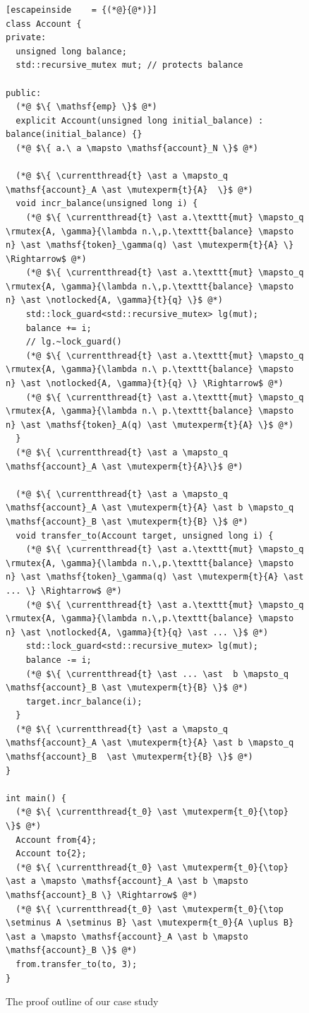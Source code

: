 \documentclass[acmsmall,screen,review,anonymous]{acmart}
\begin{document}
\begin{figure}[hp]
\begin{lstlisting}[escapeinside    = {(*@}{@*)}]
class Account {
private:
  unsigned long balance;
  std::recursive_mutex mut; // protects balance

public:
  (*@ $\{ \mathsf{emp} \}$ @*)
  explicit Account(unsigned long initial_balance) : balance(initial_balance) {}
  (*@ $\{ a.\ a \mapsto \mathsf{account}_N \}$ @*)

  (*@ $\{ \currentthread{t} \ast a \mapsto_q \mathsf{account}_A \ast \mutexperm{t}{A}  \}$ @*)
  void incr_balance(unsigned long i) {
    (*@ $\{ \currentthread{t} \ast a.\texttt{mut} \mapsto_q \rmutex{A, \gamma}{\lambda n.\,p.\texttt{balance} \mapsto n} \ast \mathsf{token}_\gamma(q) \ast \mutexperm{t}{A} \} \Rightarrow$ @*) 
    (*@ $\{ \currentthread{t} \ast a.\texttt{mut} \mapsto_q \rmutex{A, \gamma}{\lambda n.\,p.\texttt{balance} \mapsto n} \ast \notlocked{A, \gamma}{t}{q} \}$ @*) 
    std::lock_guard<std::recursive_mutex> lg(mut);
    balance += i;
    // lg.~lock_guard()
    (*@ $\{ \currentthread{t} \ast a.\texttt{mut} \mapsto_q \rmutex{A, \gamma}{\lambda n.\ p.\texttt{balance} \mapsto n} \ast \notlocked{A, \gamma}{t}{q} \} \Rightarrow$ @*)
    (*@ $\{ \currentthread{t} \ast a.\texttt{mut} \mapsto_q \rmutex{A, \gamma}{\lambda n.\ p.\texttt{balance} \mapsto n} \ast \mathsf{token}_A(q) \ast \mutexperm{t}{A} \}$ @*)
  }
  (*@ $\{ \currentthread{t} \ast a \mapsto_q \mathsf{account}_A \ast \mutexperm{t}{A}\}$ @*)

  (*@ $\{ \currentthread{t} \ast a \mapsto_q \mathsf{account}_A \ast \mutexperm{t}{A} \ast b \mapsto_q \mathsf{account}_B \ast \mutexperm{t}{B} \}$ @*)
  void transfer_to(Account target, unsigned long i) {
    (*@ $\{ \currentthread{t} \ast a.\texttt{mut} \mapsto_q \rmutex{A, \gamma}{\lambda n.\,p.\texttt{balance} \mapsto n} \ast \mathsf{token}_\gamma(q) \ast \mutexperm{t}{A} \ast ... \} \Rightarrow$ @*)
    (*@ $\{ \currentthread{t} \ast a.\texttt{mut} \mapsto_q \rmutex{A, \gamma}{\lambda n.\,p.\texttt{balance} \mapsto n} \ast \notlocked{A, \gamma}{t}{q} \ast ... \}$ @*)
    std::lock_guard<std::recursive_mutex> lg(mut);
    balance -= i;
    (*@ $\{ \currentthread{t} \ast ... \ast  b \mapsto_q \mathsf{account}_B \ast \mutexperm{t}{B} \}$ @*)
    target.incr_balance(i);
  }
  (*@ $\{ \currentthread{t} \ast a \mapsto_q \mathsf{account}_A \ast \mutexperm{t}{A} \ast b \mapsto_q \mathsf{account}_B  \ast \mutexperm{t}{B} \}$ @*)
}

int main() {
  (*@ $\{ \currentthread{t_0} \ast \mutexperm{t_0}{\top} \}$ @*)
  Account from{4};
  Account to{2};
  (*@ $\{ \currentthread{t_0} \ast \mutexperm{t_0}{\top} \ast a \mapsto \mathsf{account}_A \ast b \mapsto \mathsf{account}_B \} \Rightarrow$ @*)
  (*@ $\{ \currentthread{t_0} \ast \mutexperm{t_0}{\top \setminus A \setminus B} \ast \mutexperm{t_0}{A \uplus B} \ast a \mapsto \mathsf{account}_A \ast b \mapsto \mathsf{account}_B \}$ @*)
  from.transfer_to(to, 3);
}
\end{lstlisting}
\caption{The proof outline of our case study}
\label{transfer-proof}
\end{figure}
\end{document}
